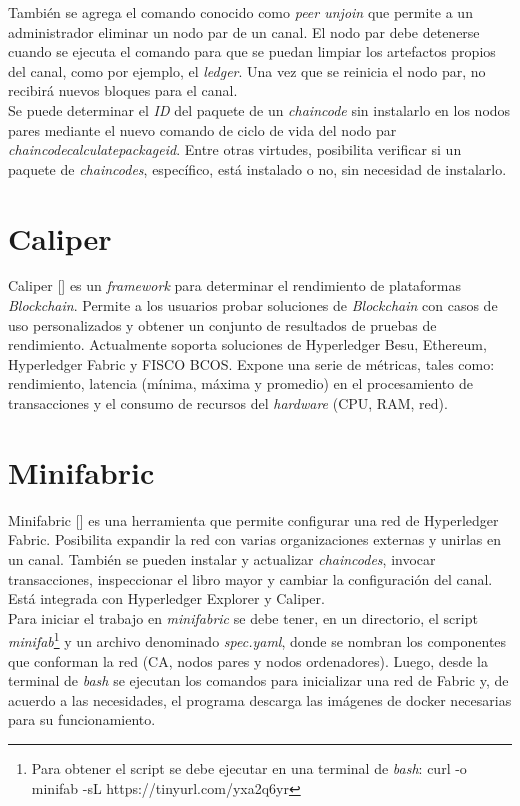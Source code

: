 {Tambi\'en se agrega el comando conocido como \emph{peer unjoin} que permite a un administrador eliminar un nodo par de un canal. El nodo par debe detenerse cuando se ejecuta el comando para que se puedan limpiar los artefactos propios del canal, como por ejemplo, el \emph{ledger}. Una vez que se reinicia el nodo par, no recibirá nuevos bloques para el canal.\\

Se puede determinar el \emph{ID} del paquete de un \emph{chaincode} sin instalarlo en los nodos pares mediante el nuevo comando de ciclo de vida del nodo par \emph{chaincodecalculatepackageid}. Entre otras virtudes, posibilita verificar si un paquete de \emph{chaincodes}, espec\'ifico, est\'a instalado o no, sin necesidad de instalarlo.

\section{Caliper}
Caliper [\cite{Caliper}] es un \emph{framework} para determinar el rendimiento de plataformas \emph{Blockchain}. Permite a los usuarios probar soluciones de \emph{Blockchain} con casos de uso personalizados y obtener un conjunto de resultados de pruebas de rendimiento. Actualmente soporta soluciones de Hyperledger Besu, Ethereum, Hyperledger Fabric y FISCO BCOS. Expone una serie de m\'etricas, tales como: rendimiento, latencia (m\'inima, m\'axima y promedio) en el procesamiento de transacciones y el consumo de recursos del \emph{hardware} (CPU, RAM, red).  

\section{Minifabric}
Minifabric [\cite{minifabric}] es una herramienta que permite configurar una red de Hyperledger Fabric. Posibilita expandir la red con varias organizaciones externas y unirlas en un canal. Tambi\'en se pueden instalar y actualizar \emph{chaincodes}, invocar transacciones, inspeccionar el libro mayor y cambiar la configuraci\'on del canal. Est\'a integrada con Hyperledger Explorer y Caliper.\\

Para iniciar el trabajo en \emph{minifabric} se debe tener, en un directorio, el script \emph{minifab}\footnote{Para obtener el script se debe ejecutar en una terminal de \emph{bash}: curl -o minifab -sL https://tinyurl.com/yxa2q6yr} y un archivo denominado \emph{spec.yaml}, donde se nombran los componentes que conforman la red (CA, nodos pares y nodos ordenadores). Luego, desde la terminal de \emph{bash} se ejecutan los comandos para inicializar una red de Fabric y, de acuerdo a las necesidades, el programa descarga las im\'agenes de docker necesarias para su funcionamiento.\\

}
